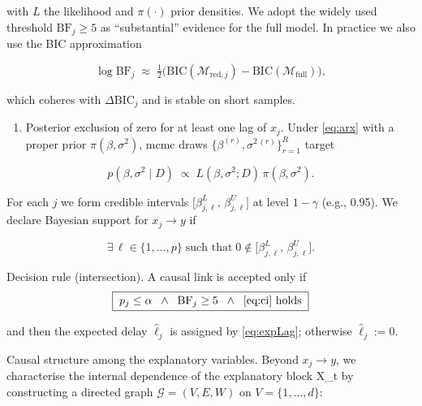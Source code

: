 \documentclass[preprint, 3p,
authoryear]{elsarticle} %
\providecommand{\tightlist}{%
  \setlength{\itemsep}{0pt}\setlength{\parskip}{0pt}}
\begin{document}
\noindent with \(L\) the likelihood and \(\pi(\cdot)\) prior densities.
We adopt the widely used threshold \(\mathrm{BF}_j\ge 5\) as
``substantial'' evidence for the full model. In practice we also use the
BIC approximation

\begin{equation}
\log \mathrm{BF}_j \;\approx\; \tfrac{1}{2}\Big(\mathrm{BIC}(\mathcal{M}_{\text{red},j})-\mathrm{BIC}(\mathcal{M}_{\text{full}})\Big),
\label{eq:bicapprox}
\end{equation}

\noindent which coheres with \(\Delta\mathrm{BIC}_j\) and is stable on
short samples.

\begin{enumerate}
\def\labelenumi{(\roman{enumi})}
\setcounter{enumi}{1}
\tightlist
\item
  Posterior exclusion of zero for at least one lag of \(x_j\). Under
  \eqref{eq:arx} with a proper prior \(\pi(\beta,\sigma^2)\), \gls{mcmc}
  draws \(\{ \beta^{(r)},\sigma^{2\,(r)}\}_{r=1}^{R}\) target
\end{enumerate}

\begin{equation}
p(\beta,\sigma^2\mid D) \;\propto\; L(\beta,\sigma^2;D)\,\pi(\beta,\sigma^2).
\end{equation}

For each \(j\) we form credible intervals
\(\big[\beta_{j,\ell}^{L},\,\beta_{j,\ell}^{U}\big]\) at level
\(1-\gamma\) (e.g., 0.95). We declare Bayesian support for \(x_j \to y\)
if

\begin{equation}
\exists\,\ell\in\{1,\dots,p\}\;\text{such that}\; 0 \notin \big[\beta_{j,\ell}^{L},\,\beta_{j,\ell}^{U}\big].
\label{eq:ci}
\end{equation}

Decision rule (intersection). A causal link is accepted only if
\begin{equation}
\boxed{\;p_j\le \alpha\;\;\wedge\;\;\mathrm{BF}_j\ge 5\;\;\wedge\;\;\text{\eqref{eq:ci} holds}\;}
\end{equation}

\noindent and then the expected delay \(\widehat{\ell}_j\) is assigned
by \eqref{eq:expLag}; otherwise \(\widehat{\ell}_j:=0\).

Causal structure among the explanatory variables. Beyond \(x_j \to y\),
we characterise the internal dependence of the explanatory block X\_t by
constructing a directed graph \(\mathcal{G}=(V,E,W)\) on
\(V=\{1,\dots,d\}\):
\end{document}
